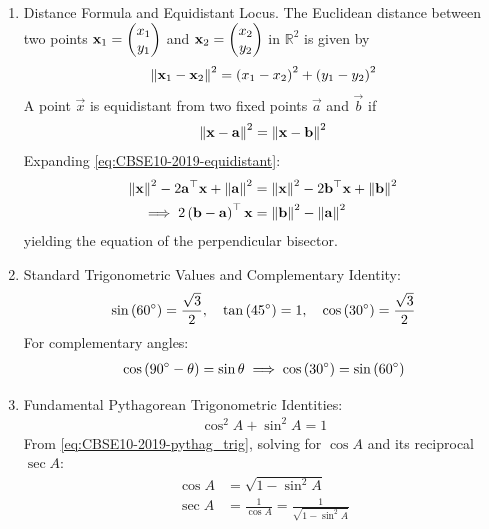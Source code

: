 \documentclass[12pt,a4paper]{article}
\begin{document}
\begin{enumerate}[label=\thesubsection.\arabic*, ref=\thesubsection.\theenumi]
	
	\item Distance Formula and Equidistant Locus.
	The Euclidean distance between two points $\mathbf{x}_1 = \begin{pmatrix}x_1 \\ y_1\end{pmatrix}$ and $\mathbf{x}_2 = \begin{pmatrix}x_2 \\ y_2\end{pmatrix}$ in $\mathbb{R}^2$ is given by
	\begin{align}
		\left\lVert\mathbf{x}_1 - \mathbf{x}_2\right\rVert^2 = \left(x_1 - x_2\right)^2 + \left(y_1 - y_2\right)^2 \label{eq:CBSE10-2019-dist_sq}
	\end{align}
	A point $\vec{x}$ is equidistant from two fixed points $\vec{a}$ and $\vec{b}$ if
	\begin{align}
		\left\lVert\mathbf{x} - \mathbf{a}\right\rVert^2 = \left\lVert\mathbf{x} - \mathbf{b}\right\rVert^2 \label{eq:CBSE10-2019-equidistant}
	\end{align}
	\solution
	Expanding \eqref{eq:CBSE10-2019-equidistant}:
	\begin{align}
		\left\lVert\mathbf{x}\right\rVert^2 - 2\mathbf{a}^\top \mathbf{x} + \left\lVert\mathbf{a}\right\rVert^2 &= \left\lVert\mathbf{x}\right\rVert^2 - 2\mathbf{b}^\top \mathbf{x} + \left\lVert\mathbf{b}\right\rVert^2 \\
		\implies 2\left(\mathbf{b} - \mathbf{a}\right)^\top \mathbf{x} &= \left\lVert\mathbf{b}\right\rVert^2 - \left\lVert\mathbf{a}\right\rVert^2 \label{eq:CBSE10-2019-perp_bisector}
	\end{align}
	yielding the equation of the perpendicular bisector.
	
	\item Standard Trigonometric Values and Complementary Identity:
	\begin{align}
		\sin\left(60^\circ\right) = \frac{\sqrt{3}}{2}, \quad \tan\left(45^\circ\right) = 1, \quad \cos\left(30^\circ\right) = \frac{\sqrt{3}}{2} \label{eq:CBSE10-2019-trig_values}
	\end{align}
	For complementary angles:
	\begin{align}
		\cos\left(90^\circ - \theta\right) = \sin\theta \implies \cos\left(30^\circ\right) = \sin\left(60^\circ\right) \label{eq:CBSE10-2019-trig_comp}
	\end{align}
	
	\item Fundamental Pythagorean Trigonometric Identities:
	\begin{align}
		\cos^2 A + \sin^2 A = 1 \label{eq:CBSE10-2019-pythag_trig}
	\end{align}
	\solution
	From \eqref{eq:CBSE10-2019-pythag_trig}, solving for $\cos A$ and its reciprocal $\sec A$:
	\begin{align}
		\cos A &= \sqrt{1 - \sin^2 A} \label{eq:CBSE10-2019-cos_from_sin} \\
		\sec A &= \frac{1}{\cos A} = \frac{1}{\sqrt{1 - \sin^2 A}} \label{eq:CBSE10-2019-sec_from_sin}
	\end{align}
	

\end{enumerate}
\end{document}
